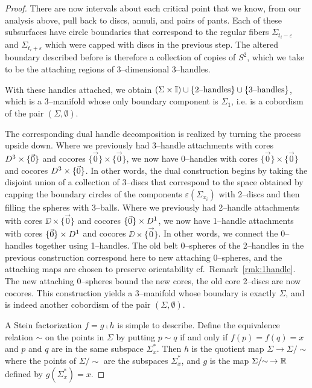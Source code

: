 \begin{proof}
	There are now intervals about each critical point that we know, from our analysis above, pull back to discs, annuli, and pairs of pants.
	Each of these subsurfaces have circle boundaries that correspond to the regular fibers $\Sigma_{t_i-\varepsilon}$ and $\Sigma_{t_i+\varepsilon}$ which were capped with discs in the previous step.
	The altered boundary described before is therefore a collection of copies of $S^2$, which we take to be the attaching regions of 3--dimensional 3--handles.
	
	With these handles attached, we obtain $(\Sigma\times\mathbb{I})\cup\{\textrm{2--handles}\}\cup\{\textrm{3--handles}\}$, which is a 3--manifold whose only boundary component is $\Sigma_1$, i.e. is a cobordism of the pair $(\Sigma,\emptyset)$.
	
	The corresponding dual handle decomposition is realized by turning the process upside down.
	Where we previously had 3--handle attachments with cores $D^3\times\{\vec{0}\}$ and cocores $\{\vec{0}\}\times\{\vec{0}\}$, we now have 0--handles with cores $\{\vec{0}\}\times\{\vec{0}\}$ and cocores $D^3\times\{\vec{0}\}$.
	In other words, the dual construction begins by taking the disjoint union of a collection of 3--discs that correspond to the space obtained by capping the boundary circles of the components $\varepsilon(\Sigma_{x_i})$ with 2--discs and then filling the spheres with 3--balls.
	Where we previously had 2--handle attachments with cores $\DD\times\{\vec{0}\}$ and cocores $\{\vec{0}\}\times D^1$, we now have 1--handle attachments with cores $\{\vec{0}\}\times D^1$ and cocores $\DD\times\{\vec{0}\}$.
	In other words, we connect the 0--handles together using 1--handles.
	The old belt 0--spheres of the 2--handles in the previous construction correspond here to new attaching 0--spheres, and the attaching maps are chosen to preserve orientability cf.\ Remark~\ref{rmk:1handle}.
	The new attaching 0--spheres bound the new cores, the old core 2--discs are now cocores.
	This construction yields a 3--manifold whose boundary is exactly $\Sigma$, and is indeed another cobordism of the pair $(\Sigma,\emptyset)$.
	
	A Stein factorization $f=g\comp h$ is simple to describe.
	Define the equivalence relation $\sim$ on the points in $\Sigma$ by putting $p\sim q$ if and only if $f(p)=f(q)=x$ and $p$ and $q$ are in the same subspace $\Sigma_x^*$.
	Then $h$ is the quotient map $\Sigma\to \Sigma/\!\!\sim$ where the points of $\Sigma/\!\!\sim$ are the subspaces $\Sigma_x^*$, and $g$ is the map $\Sigma/\!\!\sim\, \to\mathbb{R}$ defined by $g(\Sigma_x^*)=x$.


\end{proof}
